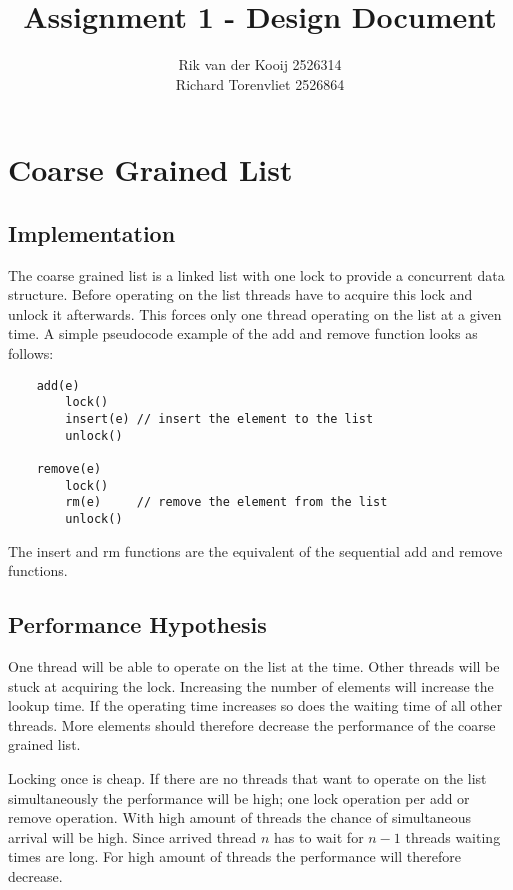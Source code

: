 \documentclass[10pt,a4paper]{article}
\author{Rik van der Kooij 2526314\\Richard Torenvliet 2526864}
\title{Assignment 1 - Design Document}
\begin{document}
\maketitle


\section{Coarse Grained List}
\subsection{Implementation}
    The coarse grained list is a linked list with one lock to provide a
    concurrent data structure. Before operating on the list threads have to
    acquire this lock and unlock it afterwards. This forces only one thread
    operating on the list at a given time. A simple pseudocode example of the
    add and remove function looks as follows:

\begin{lstlisting}
    add(e) 
        lock()
        insert(e) // insert the element to the list
        unlock()

    remove(e)
        lock()
        rm(e)     // remove the element from the list
        unlock()
\end{lstlisting}

The insert and rm functions are the equivalent of the sequential add and remove
functions.

\subsection{Performance Hypothesis}
One thread will be able to operate on the list at the time. Other threads will
be stuck at acquiring the lock. Increasing the number of elements will increase
the lookup time. If the operating time increases so does the waiting time of
all other threads. More elements should therefore decrease the performance of
the coarse grained list.

Locking once is cheap. If there are no threads that want to operate on the list
simultaneously the performance will be high; one lock operation per add or
remove operation.  With high amount of threads the chance of simultaneous
arrival will be high. Since arrived thread $n$ has to wait for $n-1$ threads
waiting times are long. For high amount of threads the performance will
therefore decrease. 
\end{document}
